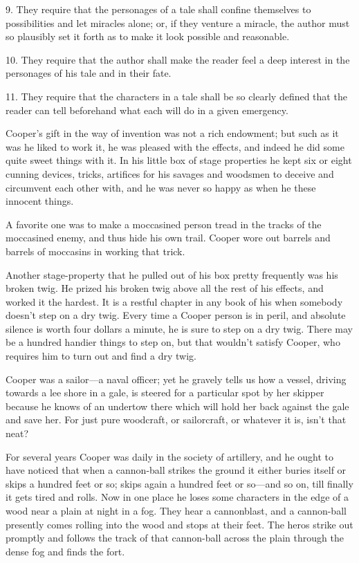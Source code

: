 \documentclass[../interior-demo.tex]{subfiles}
\begin{document}
9. They require that the personages of a tale shall confine themselves
to possibilities and let miracles alone; or, if they venture a miracle,
the author must so plausibly set it forth as to make it look possible
and reasonable.

10. They require that the author shall make the reader feel a deep
interest in the personages of his tale and in their fate.

11. They require that the characters in a tale shall be so
clearly defined that the reader can tell beforehand what each will do in a
given emergency.

Cooper's gift in the way of invention was not a rich endowment; but
such as it was he liked to work it, he was pleased with the effects,
and indeed he did some quite sweet things with it. In his little box of
stage properties he kept six or eight cunning devices, tricks, artifices
for his savages and woodsmen to deceive and circumvent each other with,
and he was never so happy as when he these
innocent things.

A favorite one was to make a moccasined person tread
in the tracks of the moccasined enemy, and thus hide his own trail.
Cooper wore out barrels and barrels of moccasins in working that trick.

Another stage-property that he pulled out of his box pretty frequently
was his broken twig. He prized his broken twig above all the rest of his
effects, and worked it the hardest. It is a restful chapter in any book
of his when somebody doesn't step on a dry twig. Every time a Cooper person is
in peril, and absolute silence is worth four dollars a minute, he is
sure to step on a dry twig. There may be a hundred handier things to
step on, but that wouldn't satisfy Cooper, who requires him to turn
out and find a dry twig.

Cooper was a sailor---a naval officer; yet he gravely tells us how
a vessel, driving towards a lee shore in a gale, is steered for a
particular spot by her skipper because he knows of an undertow there
which will hold her back against the gale and save her. For just pure
woodcraft, or sailorcraft, or whatever it is, isn't that neat?

For several years Cooper was daily in the society of artillery, and he ought
to have noticed that when a cannon-ball strikes the ground it either
buries itself or skips a hundred feet or so; skips again a hundred feet
or so---and so on, till finally it gets tired and rolls. Now in one place
he loses some characters in the edge of a wood
near a plain at night in a fog. They hear a cannonblast, and a
cannon-ball presently comes rolling into the wood and stops at their
feet. The heros strike out promptly and follows the track of that cannon-ball
across the plain through the dense fog and finds the fort.
\end{document}
